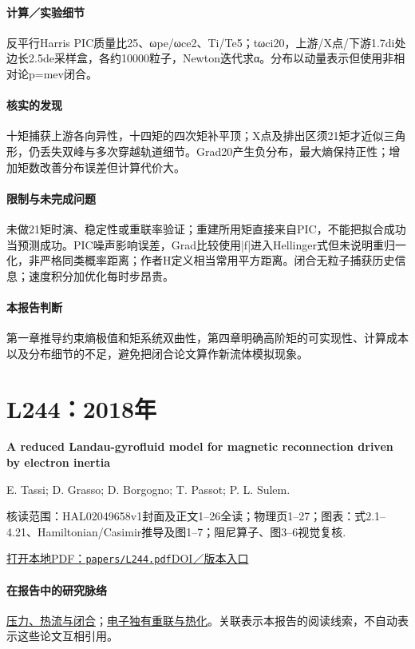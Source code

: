\paragraph{计算／实验细节}反平行Harris PIC质量比25、ωpe/ωce2、Ti/Te5；tωci20，上游/X点/下游1.7di处边长2.5de采样盒，各约10000粒子，Newton迭代求α。分布以动量表示但使用非相对论p=mev闭合。

\paragraph{核实的发现}十矩捕获上游各向异性，十四矩的四次矩补平顶；X点及排出区须21矩才近似三角形，仍丢失双峰与多次穿越轨道细节。Grad20产生负分布，最大熵保持正性；增加矩数改善分布误差但计算代价大。

\paragraph{限制与未完成问题}未做21矩时演、稳定性或重联率验证；重建所用矩直接来自PIC，不能把拟合成功当预测成功。PIC噪声影响误差，Grad比较使用|f|进入Hellinger式但未说明重归一化，非严格同类概率距离；作者H定义相当常用平方距离。闭合无粒子捕获历史信息；速度积分加优化每时步昂贵。

\paragraph{本报告判断}第一章推导约束熵极值和矩系统双曲性，第四章明确高阶矩的可实现性、计算成本以及分布细节的不足，避免把闭合论文算作新流体模拟现象。

\section{L244：2018年}\label{paper:L244}

\textbf{A reduced Landau-gyrofluid model for magnetic reconnection driven by electron inertia}\citep{L244}\

E. Tassi;  D. Grasso;  D. Borgogno;  T. Passot;  P. L. Sulem.

\textsf{核读范围：}HAL02049658v1封面及正文1–26全读；物理页1–27；\textsf{图表：}式2.1–4.21、Hamiltonian/Casimir推导及图1–7；阻尼算子、图3–6视觉复核.

\href{run:papers/L244.pdf}{打开本地PDF：\texttt{papers/L244.pdf}}\quad\href{https://doi.org/10.1017/S002237781800051X}{DOI／版本入口}

\paragraph{在报告中的研究脉络}\hyperref[story:closure]{压力、热流与闭合}；\hyperref[story:energy]{电子独有重联与热化}。关联表示本报告的阅读线索，不自动表示这些论文互相引用。

